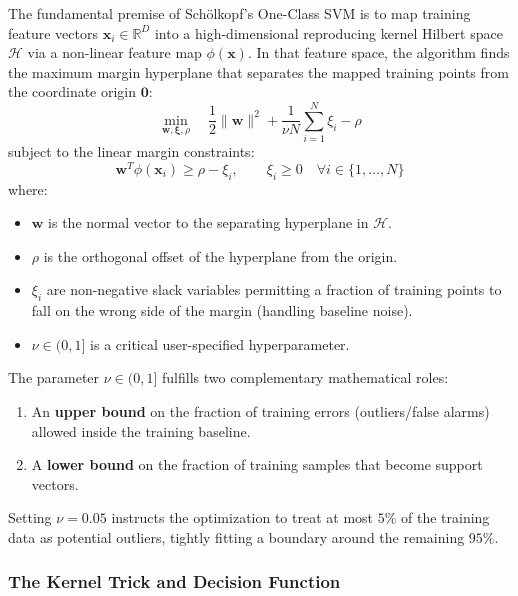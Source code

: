 The fundamental premise of Schölkopf's One-Class SVM is to map training feature vectors $\mathbf{x}_i \in \mathbb{R}^D$ into a high-dimensional reproducing kernel Hilbert space $\mathcal{H}$ via a non-linear feature map $\phi(\mathbf{x})$. In that feature space, the algorithm finds the maximum margin hyperplane that separates the mapped training points from the coordinate origin $\mathbf{0}$:
\begin{equation}
\min_{\mathbf{w}, \boldsymbol{\xi}, \rho} \quad \frac{1}{2} \|\mathbf{w}\|^2 + \frac{1}{\nu N}\sum_{i=1}^N \xi_i - \rho\label{eq:ocsvm_primal}
\end{equation}
subject to the linear margin constraints:
\begin{equation}
\mathbf{w}^T \phi(\mathbf{x}_i) \ge \rho - \xi_i, \qquad \xi_i \ge 0 \quad \forall i \in \{1, \dots, N\}\label{eq:ocsvm_constraints}
\end{equation}
where:
\begin{itemize}
    \item $\mathbf{w}$ is the normal vector to the separating hyperplane in $\mathcal{H}$.
    \item $\rho$ is the orthogonal offset of the hyperplane from the origin.
    \item $\xi_i$ are non-negative slack variables permitting a fraction of training points to fall on the wrong side of the margin (handling baseline noise).
    \item $\nu \in (0, 1]$ is a critical user-specified hyperparameter.
\end{itemize}

\begin{keyidea}
The parameter $\nu \in (0, 1]$ fulfills two complementary mathematical roles:
\begin{enumerate}
    \item An \textbf{upper bound} on the fraction of training errors (outliers/false alarms) allowed inside the training baseline.
    \item A \textbf{lower bound} on the fraction of training samples that become support vectors.
\end{enumerate}
Setting $\nu = 0.05$ instructs the optimization to treat at most $5\%$ of the training data as potential outliers, tightly fitting a boundary around the remaining $95\%$.
\end{keyidea}

\subsubsection{The Kernel Trick and Decision Function}

